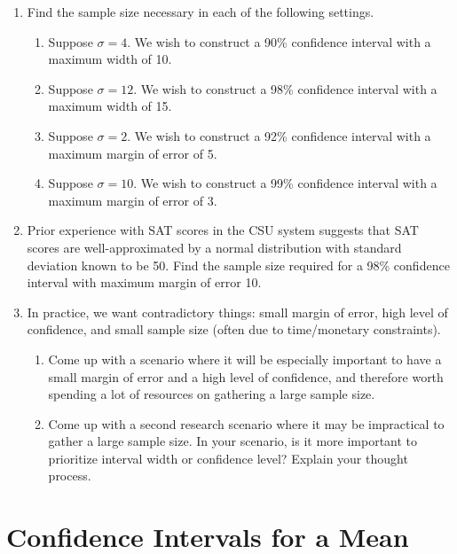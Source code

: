 \documentclass[
]{book}
\providecommand{\tightlist}{%
  \setlength{\itemsep}{0pt}\setlength{\parskip}{0pt}}
\begin{document}
\begin{enumerate}
\def\labelenumi{\arabic{enumi}.}
\tightlist
\item
  Find the sample size necessary in each of the following settings.

  \begin{enumerate}
  \def\labelenumii{\alph{enumii}.}
  \tightlist
  \item
    Suppose \(\sigma = 4\). We wish to construct a 90\% confidence interval with a maximum width of 10.
  \item
    Suppose \(\sigma = 12\). We wish to construct a 98\% confidence interval with a maximum width of 15.
  \item
    Suppose \(\sigma = 2\). We wish to construct a 92\% confidence interval with a maximum margin of error of 5.
  \item
    Suppose \(\sigma = 10\). We wish to construct a 99\% confidence interval with a maximum margin of error of 3.
  \end{enumerate}
\item
  Prior experience with SAT scores in the CSU system suggests that SAT scores are well-approximated by a normal distribution with standard deviation known to be 50. Find the sample size required for a 98\% confidence interval with maximum margin of error 10.
\item
  In practice, we want contradictory things: small margin of error, high level of confidence, and small sample size (often due to time/monetary constraints).

  \begin{enumerate}
  \def\labelenumii{\alph{enumii}.}
  \tightlist
  \item
    Come up with a scenario where it will be especially important to have a small margin of error and a high level of confidence, and therefore worth spending a lot of resources on gathering a large sample size.
  \item
    Come up with a second research scenario where it may be impractical to gather a large sample size. In your scenario, is it more important to prioritize interval width or confidence level? Explain your thought process.
  \end{enumerate}
\end{enumerate}

\section{Confidence Intervals for a Mean}\label{confidence-intervals-for-a-mean}
\end{document}
